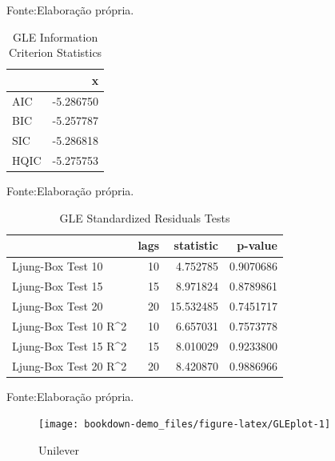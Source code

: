 \documentclass[
  12pt,
  a4paper,
  openany]{book}
\begin{document}
Fonte:Elaboração própria.

\justifying
\bigskip

\begin{table}[!h]

\caption{\label{tab:unnamed-chunk-21}GLE Information Criterion Statistics}
\centering
\begin{tabular}[t]{lr}
\toprule
  & x\\
\midrule
AIC & -5.286750\\
BIC & -5.257787\\
SIC & -5.286818\\
HQIC & -5.275753\\
\bottomrule
\end{tabular}
\end{table}
\FloatBarrier
\centering

Fonte:Elaboração própria.

\justifying
\bigskip

\begin{table}[!h]

\caption{\label{tab:unnamed-chunk-22}GLE Standardized Residuals Tests}
\centering
\begin{tabular}[t]{lrrr}
\toprule
  & lags & statistic & p-value\\
\midrule
Ljung-Box Test 10 & 10 & 4.752785 & 0.9070686\\
Ljung-Box Test 15 & 15 & 8.971824 & 0.8789861\\
Ljung-Box Test 20 & 20 & 15.532485 & 0.7451717\\
Ljung-Box Test 10 R\textasciicircum{}2 & 10 & 6.657031 & 0.7573778\\
Ljung-Box Test 15 R\textasciicircum{}2 & 15 & 8.010029 & 0.9233800\\
\addlinespace
Ljung-Box Test 20 R\textasciicircum{}2 & 20 & 8.420870 & 0.9886966\\
\bottomrule
\end{tabular}
\end{table}
\FloatBarrier
\centering

Fonte:Elaboração própria.

\justifying
\bigskip
\begin{figure}

{\centering \texttt{[image: bookdown-demo\_files/figure-latex/GLEplot-1]} 

}

\caption{Unilever}\label{fig:GLEplot}
\end{figure}
\FloatBarrier
\centering
\end{document}
